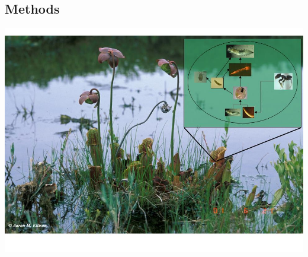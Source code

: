 \documentclass[a0,landscape]{a0poster}
\begin{document}
\begin{multicols}{3}


\color{DarkSlateGray} %




\section*{Methods}


\begin{center}
\includegraphics[width=0.75\linewidth]{spfoodweb}
\end{center}


\end{multicols}
\end{document}
